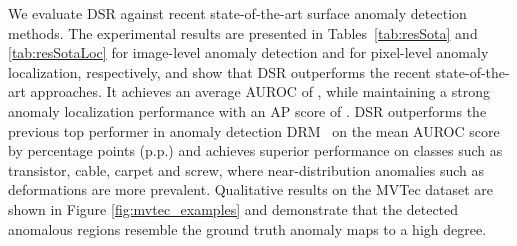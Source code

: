 \documentclass[runningheads]{llncs}
\begin{document}
We evaluate DSR against recent state-of-the-art surface anomaly detection methods. The experimental results are presented in Tables~\ref{tab:resSota} and \ref{tab:resSotaLoc} for image-level anomaly detection and for pixel-level anomaly localization, respectively, and show that DSR outperforms the recent state-of-the-art approaches. It achieves an average AUROC of , while maintaining a strong anomaly localization performance with an AP score of . DSR outperforms the previous top performer in anomaly detection DRM~\cite{zavrtanik2021draem} on the mean AUROC score by  percentage points (p.p.) and achieves superior performance on classes such as transistor, cable, carpet and screw, where near-distribution anomalies such as deformations are more prevalent. Qualitative results on the MVTec dataset are shown in Figure \ref{fig:mvtec_examples} and demonstrate that the detected anomalous regions resemble the ground truth anomaly maps to a high degree. 

\begin{table*}
\centering
{}
\caption{Results (AP) of anomaly localization on MVTec dataset.}
\label{tab:resSotaLoc}
\end{table*}
\end{document}
